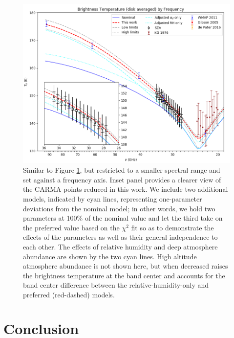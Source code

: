 \documentclass{article}
\begin{document}
	\begin{figure}
		\centering
		\includegraphics[width=\textwidth]{final_models_freq.png}
		\caption{\label{fig:emission_freq}Similar to Figure \ref{fig:emission_freq}, but restricted to a smaller spectral range and set against a frequency axis. Inset panel provides a clearer view of the CARMA points reduced in this work. We include two additional models, indicated by cyan lines, representing one-parameter deviations from the nominal model; in other words, we hold two parameters at 100\% of the nominal value and let the third take on the preferred value based on the $\chi^{2}$ fit so as to demonstrate the effects of the parameters as well as their general independence to each other. The effects of relative humidity and deep atmosphere abundance are shown by the two cyan lines. High altitude atmosphere abundance is not shown here, but when decreased raises the brightness temperature at the band center and accounts for the band center difference between the relative-humidity-only and preferred (red-dashed) models.}
	\end{figure}


\section{Conclusion}
\end{document}
